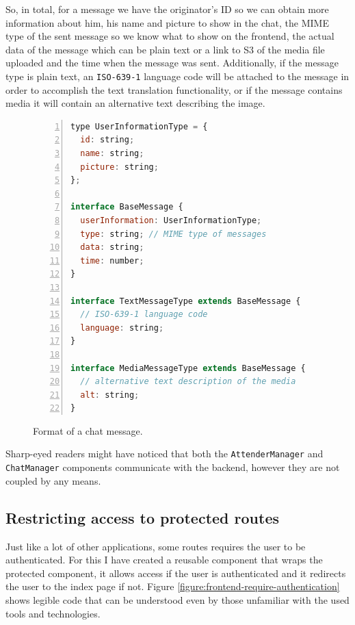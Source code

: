 So, in total, for a message we have the originator's ID so we can obtain more information about him, his name and picture to show in the chat, the MIME type of the sent message so we know what to show on the frontend, the actual data of the message which can be plain text or a link to S3 of the media file uploaded and the time when the message was sent. Additionally, if the message type is plain text, an \verb|ISO-639-1| language code will be attached to the message in order to accomplish the text translation functionality, or if the message contains media it will contain an alternative text describing the image.

\begin{figure}[H]
\begin{lstlisting}[numbers=left,language=JavaScript]
type UserInformationType = {
  id: string;
  name: string;
  picture: string;
};

interface BaseMessage {
  userInformation: UserInformationType;
  type: string; // MIME type of messages
  data: string;
  time: number;
}

interface TextMessageType extends BaseMessage {
  // ISO-639-1 language code
  language: string;
}

interface MediaMessageType extends BaseMessage {
  // alternative text description of the media
  alt: string;
}
\end{lstlisting}
\caption{Format of a chat message.}
\label{figure:frontend-chatmanager-message}
\end{figure}

Sharp-eyed readers might have noticed that both the \verb|AttenderManager| and \verb|ChatManager| components communicate with the backend, however they are not coupled by any means.

\subsection{Restricting access to protected routes}

Just like a lot of other applications, some routes requires the user to be authenticated. For this I have created a reusable component that wraps the protected component, it allows access if the user is authenticated and it redirects the user to the index page if not. Figure \ref{figure:frontend-require-authentication} shows legible code that can be understood even by those unfamiliar with the used tools and technologies.


